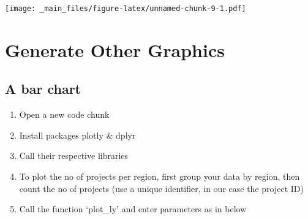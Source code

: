 \documentclass[
]{book}
\newenvironment{Shaded}{\begin{snugshade}}{\end{snugshade}}
\newcommand{\AttributeTok}[1]{\textcolor[rgb]{0.77,0.63,0.00}{#1}}
\newcommand{\DecValTok}[1]{\textcolor[rgb]{0.00,0.00,0.81}{#1}}
\newcommand{\FunctionTok}[1]{\textcolor[rgb]{0.00,0.00,0.00}{#1}}
\newcommand{\NormalTok}[1]{#1}
\newcommand{\OtherTok}[1]{\textcolor[rgb]{0.56,0.35,0.01}{#1}}
\newcommand{\SpecialCharTok}[1]{\textcolor[rgb]{0.00,0.00,0.00}{#1}}
\newcommand{\StringTok}[1]{\textcolor[rgb]{0.31,0.60,0.02}{#1}}
\providecommand{\tightlist}{%
  \setlength{\itemsep}{0pt}\setlength{\parskip}{0pt}}
\begin{document}
\texttt{[image: \_main\_files/figure-latex/unnamed-chunk-9-1.pdf]}

\hypertarget{generate-other-graphics}{%
\section{Generate Other Graphics}\label{generate-other-graphics}}

\hypertarget{a-bar-chart}{%
\subsection{A bar chart}\label{a-bar-chart}}

\begin{enumerate}
\def\labelenumi{\arabic{enumi}.}
\tightlist
\item
  Open a new code chunk
\item
  Install packages plotly \& dplyr
\item
  Call their respective libraries
\item
  To plot the no of projects per region, first group your data by region, then count the no of projects (use a unique identifier, in our case the project ID)
\item
  Call the function `plot\_ly' and enter parameters as in below
\end{enumerate}

\begin{Shaded}
\end{Shaded}
\end{document}
